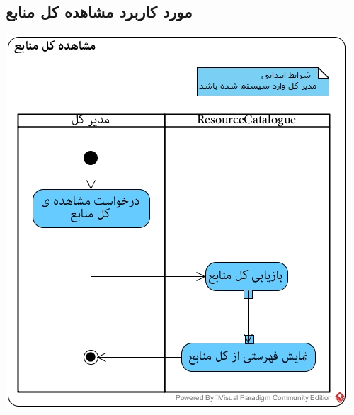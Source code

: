 \subsection*{مورد کاربرد مشاهده کل منابع}
\vspace{1cm}
\begin{center}
\includegraphics[width=\textwidth]{ActivityDiagramsWithSwimlanes/35.jpg}
\end{center}

\newpage
\vspace{1cm}
